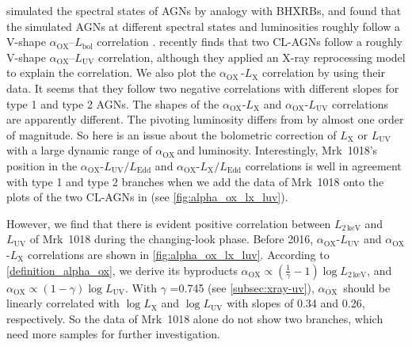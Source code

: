 \documentclass[twocolumn]{aastex63}
\newcommand{\alphaox}{$\alpha_\mathrm{OX}$}
\begin{document}
\citet{2011MNRAS.413.2259S} simulated the spectral states of AGNs by analogy with BHXRBs, and found that the simulated AGNs at different spectral states and luminosities roughly follow a V-shape \alphaox--$L_\mathrm{bol}$ correlation \citep[see also in ][]{2019ApJ...883...76R}. \citet{2019arXiv190904676R} recently finds that two CL-AGNs follow a roughly V-shape \alphaox--$L_\mathrm{UV}$ correlation, although they applied an X-ray reprocessing model to explain the correlation. We also plot the \alphaox\,-$L_\mathrm{X}$ correlation by using their data. It seems that they follow two negative correlations with different slopes for type 1 and type 2 AGNs. The shapes of the \alphaox-$L_\mathrm{X}$ and \alphaox-$L_\mathrm{UV}$ correlations are apparently different. The pivoting luminosity differs from \citet{2011ApJ...739...64X} by almost one order of magnitude. So here is an issue about the bolometric correction of $L_\mathrm{X}$ or $L_\mathrm{UV}$ with a large dynamic range of \alphaox \,and luminosity. Interestingly, Mrk~1018's position in the \alphaox-$L_\mathrm{UV}/L_\mathrm{Edd}$ and \alphaox-$L_\mathrm{X}/L_\mathrm{Edd}$ correlations is well in agreement with type 1 and type 2 branches when we add the data of Mrk~1018 onto the plots of the two CL-AGNs in \citet{2019arXiv190904676R} (see \autoref{fig:alpha_ox_lx_luv}).

However, we find that there is evident positive correlation between $L_\mathrm{2\,keV}$ and $L_\mathrm{UV}$ of Mrk~1018 during the changing-look phase. Before 2016, \alphaox-$L_\mathrm{UV}$ and \alphaox-$L_\mathrm{X}$ correlations are shown in \autoref{fig:alpha_ox_lx_luv}. According to \autoref{definition_alpha_ox}, we derive its byproducts \alphaox $\propto (\frac{1}{\gamma}-1) \log L_\mathrm{2\,keV}$, and \alphaox $\propto (1-\gamma) \log L_\mathrm{UV}$. With $\gamma$ =0.745 (see \autoref{subsec:xray-uv}), \alphaox\, should be linearly correlated with $\log L_\mathrm{X}$ and $\log L_\mathrm{UV}$ with slopes of 0.34 and 0.26, respectively. So the data of Mrk~1018 alone do not show two branches, which need more samples for further investigation. 



 

\end{document}
